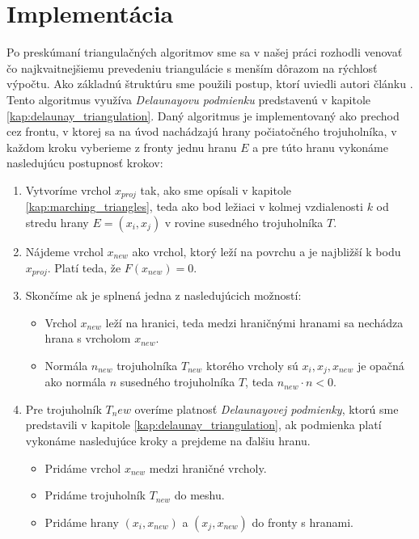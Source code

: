 \chapter{Implementácia}

Po preskúmaní triangulačných algoritmov sme sa v našej práci rozhodli venovať čo najkvaitnejšiemu
prevedeniu triangulácie s menším dôrazom na rýchlosť výpočtu. Ako základnú štruktúru sme použili 
postup, ktorí uviedli autori článku \cite{hilton1996marching}. Tento algoritmus využíva 
\textit{Delaunayovu podmienku} predstavenú v kapitole \ref{kap:delaunay_triangulation}.
Daný algoritmus je implementovaný ako prechod cez frontu, v ktorej sa na úvod nachádzajú
hrany počiatočného trojuholníka, v každom kroku vyberieme z fronty jednu hranu $E$ a pre túto
hranu vykonáme nasledujúcu postupnosť krokov:
\begin{enumerate}
    \item{Vytvoríme vrchol $x_{proj}$ tak, ako sme opísali v kapitole \ref{kap:marching_triangles}, teda 
    ako bod ležiaci v kolmej vzdialenosti $k$ od stredu hrany $E = (x_i, x_j)$ v rovine susedného 
    trojuholníka $T$.}
    \item{Nájdeme vrchol $x_{new}$ ako vrchol, ktorý leží na povrchu a je najbližší k bodu $x_{proj}$. 
    Platí teda, že $F(x_{new}) = 0$.}
    \item{Skončíme ak je splnená jedna z nasledujúcich možností:
    \begin{itemize}
        \item{Vrchol $x_{new}$ leží na hranici, teda medzi hraničnými hranami sa nechádza hrana s vrcholom 
        $x_{new}$.}
        \item{Normála $n_{new}$ trojuholníka $T_{new}$ ktorého vrcholy sú $x_i, x_j, x_{new}$ je opačná ako
        normála $n$ susedného trojuholníka $T$, teda $n_{new} \cdot n < 0$.}
    \end{itemize}
    }
    \item{Pre trojuholník $T_new$ overíme platnosť \textit{Delaunayovej podmienky}, 
    ktorú sme predstavili v kapitole \ref{kap:delaunay_triangulation}, ak podmienka platí
    vykonáme nasledujúce kroky a prejdeme na ďalšiu hranu.
    \begin{itemize}
        \item{Pridáme vrchol $x_{new}$ medzi hraničné vrcholy.}
        \item{Pridáme trojuholník $T_{new}$ do meshu.}
        \item{Pridáme hrany $(x_i, x_{new})$ a $(x_j, x_{new})$ do fronty s hranami.}

\end{itemize}}
\end{enumerate}
